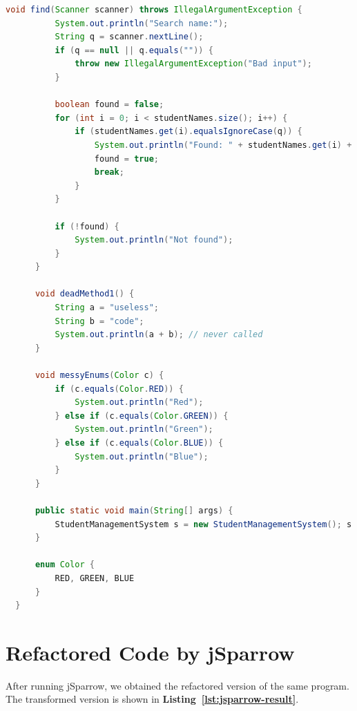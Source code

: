 \documentclass[a4paper,12pt]{article}
\begin{document}
\begin{lstlisting}[language=Java, caption={Original Test Subject Java Code}, label={lst:test-subject}]
      void find(Scanner scanner) throws IllegalArgumentException {
          System.out.println("Search name:");
          String q = scanner.nextLine();
          if (q == null || q.equals("")) {
              throw new IllegalArgumentException("Bad input");
          }
  
          boolean found = false;
          for (int i = 0; i < studentNames.size(); i++) {
              if (studentNames.get(i).equalsIgnoreCase(q)) {
                  System.out.println("Found: " + studentNames.get(i) + ", ID: " + studentIds.get(i));
                  found = true;
                  break;
              }
          }
  
          if (!found) {
              System.out.println("Not found");
          }
      }
  
      void deadMethod1() {
          String a = "useless";
          String b = "code";
          System.out.println(a + b); // never called
      }
  
      void messyEnums(Color c) {
          if (c.equals(Color.RED)) {
              System.out.println("Red");
          } else if (c.equals(Color.GREEN)) {
              System.out.println("Green");
          } else if (c.equals(Color.BLUE)) {
              System.out.println("Blue");
          }
      }
  
      public static void main(String[] args) {
          StudentManagementSystem s = new StudentManagementSystem(); s.menu();
      }
  
      enum Color {
          RED, GREEN, BLUE
      }
  }  
\end{lstlisting}

\newpage 

\section{Refactored Code by jSparrow}

After running jSparrow, we obtained the refactored version of the same program. The transformed version is shown in \textbf{Listing~\ref{lst:jsparrow-result}}.
\end{document}
